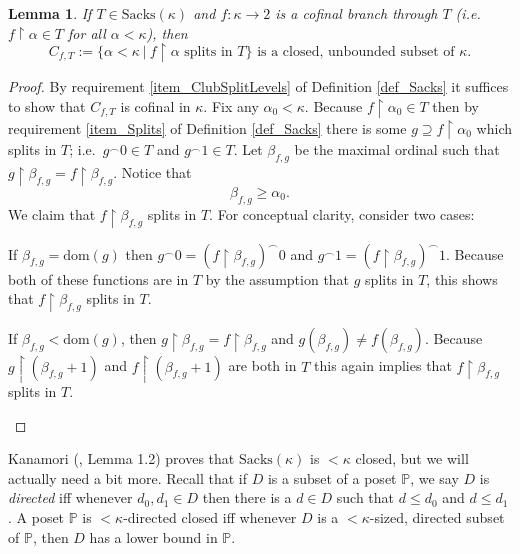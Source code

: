 \documentclass{amsart}
\newtheorem{lemma}[theorem]{Lemma}
\begin{document}
\begin{lemma}\label{lem_ClubSplittingBranch}
If $T \in \text{Sacks}(\kappa)$ and $f: \kappa \to 2$ is a cofinal branch through $T$ (i.e. $f \restriction \alpha \in T$ for all $\alpha < \kappa$), then 
\[
C_{f,T}:= \{ \alpha < \kappa \ | \  f \restriction \alpha \text{ splits in } T  \} \text{ is a closed, unbounded subset of } \kappa.
\]
\end{lemma}
\begin{proof}
By requirement \ref{item_ClubSplitLevels} of Definition \ref{def_Sacks} it suffices to show that $C_{f,T}$ is cofinal in $\kappa$.  Fix any $\alpha_0 < \kappa$.  Because $f \restriction \alpha_0 \in T$ then by requirement \ref{item_Splits} of Definition \ref{def_Sacks} there is some $g \supseteq f \restriction \alpha_0$ which splits in $T$; i.e.\ $g^\frown 0 \in T$ and $g^\frown 1 \in T$.  Let $\beta_{f,g}$ be the maximal ordinal such that $g \restriction \beta_{f,g} = f \restriction \beta_{f,g}$.  Notice that
\[
\beta_{f,g} \ge \alpha_0.
\]
We claim that $f \restriction \beta_{f,g}$ splits in $T$.  For conceptual clarity, consider two cases:  
\begin{enumerate*}
 \item If $\beta_{f,g} = \text{dom}(g)$ then $
 g^\frown 0 = (f \restriction \beta_{f,g})^\frown 0$ and $g^\frown 1 = (f \restriction \beta_{f,g})^\frown 1$.  Because both of these functions are in $T$ by the assumption that $g$ splits in $T$, this shows that $f \restriction \beta_{f,g}$ splits in $T$.
 \item If $\beta_{f,g} < \text{dom}(g)$, then $g \restriction \beta_{f,g} = f \restriction \beta_{f,g}$ and $g(\beta_{f,g}) \ne f(\beta_{f,g})$.  Because $g \restriction (\beta_{f,g} + 1)$ and $f \restriction (\beta_{f,g} + 1)$ are both in $T$ this again implies that $f \restriction \beta_{f,g}$ splits in $T$.
\end{enumerate*}


\end{proof}


Kanamori (\cite{MR593029}, Lemma 1.2) proves that $\text{Sacks}(\kappa)$ is $<\kappa$ closed, but we will actually need a bit more.  Recall that if $D$ is a subset of a poset $\mathbb{P}$, we say $D$ is \emph{directed} iff whenever $d_0,d_1 \in D$ then there is a $d \in D$ such that $d \le d_0$ and $d \le d_1$.  A poset $\mathbb{P}$ is $<\kappa$-directed closed iff whenever $D$ is a $<\kappa$-sized, directed subset of $\mathbb{P}$, then $D$ has a lower bound in $\mathbb{P}$.
\end{document}
